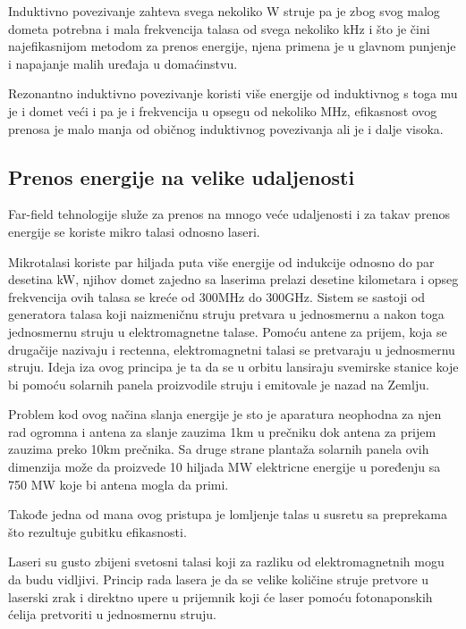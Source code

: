 \documentclass[a4paper]{article}
\begin{document}
Induktivno povezivanje zahteva svega nekoliko W struje pa je zbog svog malog dometa potrebna i mala frekvencija talasa od svega nekoliko kHz i što je čini najefikasnijom metodom za prenos energije, njena primena je u glavnom punjenje i napajanje malih uređaja u domaćinstvu.

Rezonantno induktivno povezivanje koristi više energije od induktivnog s toga mu je i domet veći i pa je i frekvencija u opsegu od nekoliko MHz, efikasnost ovog prenosa je malo manja od običnog induktivnog povezivanja ali je i dalje visoka.

\subsection{Prenos energije na velike udaljenosti}
\label{subsec:prenosenergijenavelikeudaljenosti}


Far-field tehnologije služe za prenos na mnogo veće udaljenosti i za takav prenos energije se koriste mikro talasi odnosno laseri.

Mikrotalasi koriste par hiljada puta više energije od indukcije odnosno do par desetina kW, njihov domet zajedno sa laserima prelazi desetine kilometara i opseg frekvencija ovih talasa se kreće od 300MHz do 300GHz. Sistem se sastoji od generatora talasa koji naizmeničnu struju pretvara u jednosmernu a nakon toga jednosmernu struju u elektromagnetne talase. Pomoću antene za prijem, koja se drugačije nazivaju i rectenna, elektromagnetni talasi se pretvaraju u jednosmernu struju. Ideja iza ovog principa je ta da se u orbitu lansiraju svemirske stanice koje bi pomoću solarnih panela proizvodile struju i emitovale je nazad na Zemlju.

Problem kod ovog načina slanja energije je sto je aparatura neophodna za njen rad ogromna i antena za slanje zauzima 1km u prečniku dok antena za prijem zauzima preko 10km prečnika. Sa druge strane plantaža solarnih panela ovih dimenzija može da proizvede 10 hiljada MW elektricne energije u poređenju sa 750 MW koje bi antena mogla da primi.

Takođe jedna od mana ovog pristupa je lomljenje talas u susretu sa preprekama što rezultuje gubitku efikasnosti.

Laseri su gusto zbijeni svetosni talasi koji za razliku od elektromagnetnih mogu da budu vidljivi. Princip rada lasera je da se velike količine struje pretvore u laserski zrak i direktno upere u prijemnik koji će laser pomoću fotonaponskih ćelija pretvoriti u jednosmernu struju.
\end{document}
